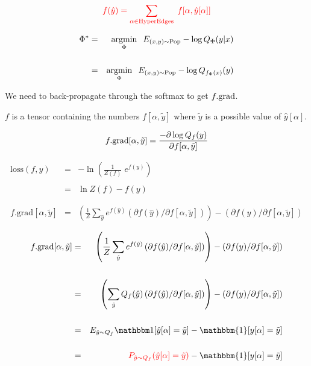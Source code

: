 {\vfill


$${\color{red} f(\hat{y}) = \sum_{\alpha \in \mathrm{HyperEdges}}  \; f[\alpha,\hat{y}[\alpha]]}$$


\begin{eqnarray*}
\Phi^* & =  & \operatorname*{argmin}_\Phi \;\;E_{(x,y) \sim \mathrm{Pop}}  -\log Q_\Phi(y|x) \\
\\
 & = &  \operatorname*{argmin}_\Phi \;\;E_{(x,y) \sim \mathrm{Pop}}  -\log Q_{f_\Phi(x)}(y)
 \end{eqnarray*}

\vfill
We need to back-propagate through the softmax to get $f.\mathrm{grad}$.

\vfill
$f$ is a tensor containing the numbers $f[\alpha,\tilde{y}]$ where $\tilde{y}$ is a possible value of $\hat{y}[\alpha]$.

\vfill
$$f.\mathrm{grad}[\alpha,\tilde{y}] = \frac{- \partial \log Q_f(y)}{\partial f[\alpha,\tilde{y}]}$$


\bigskip
\begin{eqnarray*}
  \mathrm{loss}(f,y) & = & - \ln \left(\frac{1}{Z(f)}\;e^{f(y)}\right) \\
  \\
  & = & \ln Z(f) - f(y) \\
  \\
  \\
  f.\mathrm{grad}[\alpha,\tilde{y}]
    & = & \left(\frac{1}{Z} \sum_{\hat{y}} e^{f(\hat{y})} \left(\partial f(\hat{y})/\partial f[\alpha,\tilde{y}]\right)\right)
    - \left(\partial f(y) /\partial f[\alpha,\tilde{y}]\right)
\end{eqnarray*}


\bigskip
\begin{eqnarray*}
    f.\mathrm{grad}[\alpha,\tilde{y}]
    & = & \left(\frac{1}{Z} \sum_{\hat{y}} e^{f(\hat{y})} \left(\partial f(\hat{y})/\partial f[\alpha,\tilde{y}]\right)\right)
    - \left(\partial f(y) /\partial f[\alpha,\tilde{y}]\right)    \\
    \\
    & = & \left(\sum_{\hat{y}} Q_f(\hat{y}) \left(\partial f(\hat{y})/\partial f[\alpha,\tilde{y}]\right)\right)
    - \left(\partial f(y) /\partial f[\alpha,\tilde{y}]\right)    \\
    \\
    & = & E_{\hat{y} \sim Q_f}\bbone[\hat{y}[\alpha] = \tilde{y}]
    - \mathbbm{1}[y[\alpha] = \tilde{y}] \\
    \\
    & = & {\color{red} P_{\hat{y} \sim Q_f}(\hat{y}[\alpha] = \tilde{y})}
      - \mathbbm{1}[y[\alpha] = \tilde{y}]
\end{eqnarray*}

}
